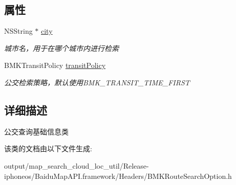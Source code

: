 \subsection*{属性}
\begin{DoxyCompactItemize}
\item 
\hypertarget{interface_b_m_k_transit_route_plan_option_ad3060cccd7cae43c4564a42f19b972aa}{}N\+S\+String $\ast$ \hyperlink{interface_b_m_k_transit_route_plan_option_ad3060cccd7cae43c4564a42f19b972aa}{city}\label{interface_b_m_k_transit_route_plan_option_ad3060cccd7cae43c4564a42f19b972aa}

\begin{DoxyCompactList}\small\item\em 城市名，用于在哪个城市内进行检索 \end{DoxyCompactList}\item 
\hypertarget{interface_b_m_k_transit_route_plan_option_a78e87e470653062316a53e6e8e5399e5}{}B\+M\+K\+Transit\+Policy \hyperlink{interface_b_m_k_transit_route_plan_option_a78e87e470653062316a53e6e8e5399e5}{transit\+Policy}\label{interface_b_m_k_transit_route_plan_option_a78e87e470653062316a53e6e8e5399e5}

\begin{DoxyCompactList}\small\item\em 公交检索策略，默认使用\+B\+M\+K\+\_\+\+T\+R\+A\+N\+S\+I\+T\+\_\+\+T\+I\+M\+E\+\_\+\+F\+I\+R\+S\+T \end{DoxyCompactList}\end{DoxyCompactItemize}


\subsection{详细描述}
公交查询基础信息类 

该类的文档由以下文件生成\+:\begin{DoxyCompactItemize}
\item 
output/map\+\_\+search\+\_\+cloud\+\_\+loc\+\_\+util/\+Release-\/iphoneos/\+Baidu\+Map\+A\+P\+I.\+framework/\+Headers/B\+M\+K\+Route\+Search\+Option.\+h\end{DoxyCompactItemize}
